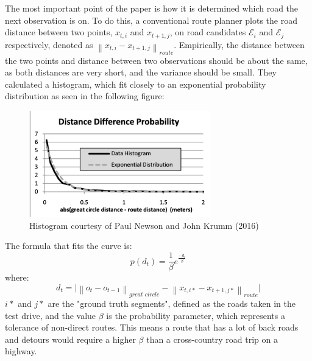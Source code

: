 \documentclass[12pt,a4paper]{report}
\begin{document}
The most important point of the paper is how it is determined which road the next observation is on. To do this, a conventional route planner plots the road distance between
two points, $x_{t,i}$ and $x_{t+1,j}$, on road candidates $\mathcal{E}_i$ and $\mathcal{E}_j$ respectively, denoted as $\left\|x_{t,i} - x_{t+1,j}\right\|_{\textit{route}}$. Empirically, the distance between the two points and distance between two observations
should be about the same, as both distances are very short, and the variance should be small. They calculated a histogram, which fit closely to an exponential probability distribution as seen in the following figure:

\begin{figure}[h!]
	\centering
	\includegraphics[width=0.7\textwidth]{histogram.png}
	\caption{Histogram courtesy of Paul Newson and John Krumm (2016)}
\end{figure}

The formula that fits the curve is:
\[
	p(d_t) = \frac{1}{\beta}e^{\frac{-d_t}{\beta}}
\]
where:
\[
	d_t = \bigg | \left\|o_t - o_{t-1}\right\|_{\textit{great circle}} - \left\|x_{t,i*} - x_{t+1,j*}\right\|_{\textit{route}}\bigg |
\]
$i*$ and $j*$ are the "ground truth segments", defined as the roads taken in the test drive, and the value $\beta$ is the probability parameter, which represents a tolerance of non-direct routes.
This means a route that has a lot of back roads and detours would require a higher $\beta$ than a cross-country road trip on a highway.
\end{document}
